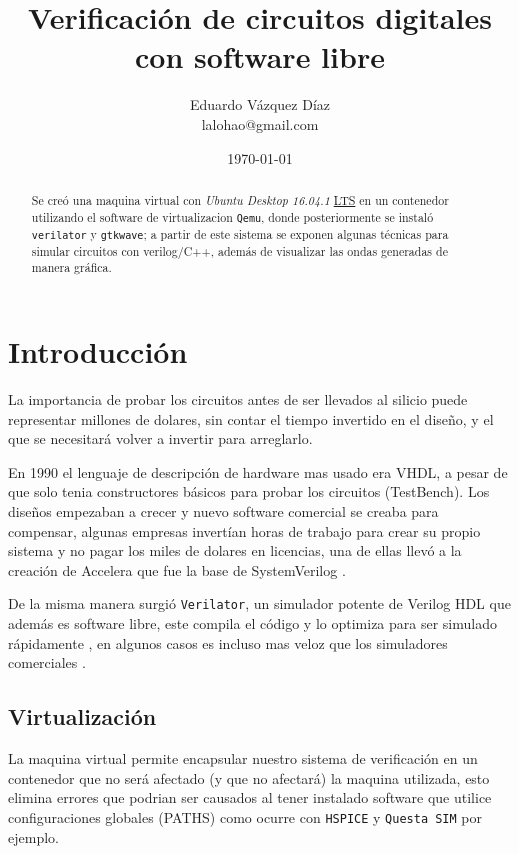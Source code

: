 \documentclass[11pt]{/home/hao/dev/org/latex-plantilla/IEEEtran}
\author{Eduardo Vázquez Díaz \\ lalohao@gmail.com}
\date{\today}
\title{Verificación de circuitos digitales con software libre}
\begin{document}
\maketitle
\tableofcontents

\begin{abstract}
Se creó una maquina virtual con \emph{Ubuntu Desktop 16.04.1} \uline{LTS} en un
contenedor utilizando el software de virtualizacion \texttt{Qemu}, donde
posteriormente se instaló \texttt{verilator} y \texttt{gtkwave}; a partir de este
sistema se exponen algunas técnicas para simular circuitos con
verilog/C++, además de visualizar las ondas generadas de manera
gráfica.
\end{abstract}

\section{Introducción}
\label{sec:org5224c39}
La importancia de probar los circuitos antes de ser llevados al
silicio puede representar millones de dolares, sin contar el tiempo
invertido en el diseño, y el que se necesitará volver a invertir
para arreglarlo.

En 1990 el lenguaje de descripción de hardware mas usado era VHDL, a
pesar de que solo tenia constructores básicos para probar los
circuitos (TestBench). Los diseños empezaban a crecer y nuevo
software comercial se creaba para compensar, algunas empresas
invertían horas de trabajo para crear su propio sistema y no pagar
los miles de dolares en licencias, una de ellas llevó a la creación
de Accelera que fue la base de SystemVerilog \cite{spear08_system}.

De la misma manera surgió \texttt{Verilator}, un simulador potente de
Verilog HDL que además es software libre, este compila el código y
lo optimiza para ser simulado rápidamente \cite{verilator-intro}, en
algunos casos es incluso mas veloz que los simuladores comerciales
\cite{verilator-vs-comercial}.
\subsection{Virtualización}
\label{sec:orgcf7f2d8}
La maquina virtual permite encapsular nuestro sistema de
verificación en un contenedor que no será afectado (y que no
afectará) la maquina utilizada, esto elimina errores que podrian ser
causados al tener instalado software que utilice configuraciones
globales (PATHS) como ocurre con \texttt{HSPICE} y \texttt{Questa SIM} por
ejemplo.
\end{document}
